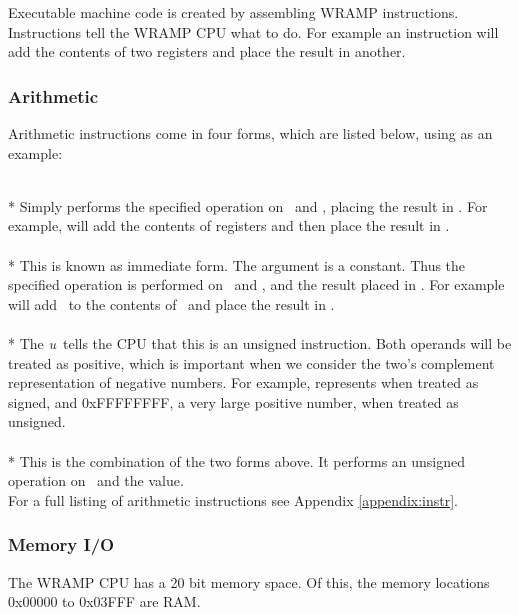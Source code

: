 Executable machine code is created by assembling WRAMP instructions.
Instructions tell the WRAMP CPU what to do. For example an 
instruction will add the contents of two registers and place the result
in another.

\subsubsection{Arithmetic}
Arithmetic instructions come in four forms, which are listed
below, using  as an example:


 \\*
Simply performs the specified operation
on \regs\ and \regt, placing the result in \regd. For example,
\mbox{} will add the contents of registers
 and  then place the result in .
\\

 \\*
This is known as immediate form.
The argument  is a constant. Thus the specified
operation is performed on \regs\ and , and the result
placed in \regd. For example \mbox{} will add
\ to the contents of \ and place the result in .
\\

 \\* 
The \emph{u}\ tells the CPU that this is an unsigned instruction.
Both operands will be treated as positive, which is important when
we consider the two's complement representation of negative numbers.
For example, \mbox{} 
represents  when treated as signed, and 0xFFFFFFFF, a very 
large positive number, when treated as unsigned.
\\

 \\*
This is the combination of the two forms above. It performs an unsigned
operation on \regs\ and the  value.
\\

For a full listing of arithmetic instructions see Appendix
\ref{appendix:instr}.

\subsubsection{Memory I/O}
The WRAMP CPU has a 20 bit memory space. Of this, the memory locations 
0x00000 to 0x03FFF are RAM.

